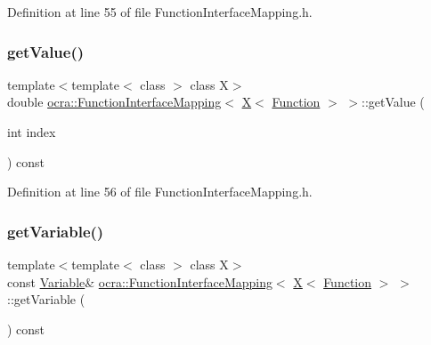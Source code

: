 Definition at line 55 of file Function\+Interface\+Mapping.\+h.

\hypertarget{structocra_1_1FunctionInterfaceMapping_3_01X_3_01Function_01_4_01_4_a97e745dc7e7a8a2af03e57d71aefa31c}{}\label{structocra_1_1FunctionInterfaceMapping_3_01X_3_01Function_01_4_01_4_a97e745dc7e7a8a2af03e57d71aefa31c} 
\subsubsection{\texorpdfstring{get\+Value()}{getValue()}\hspace{0.1cm}{\footnotesize\ttfamily [2/2]}}
{\footnotesize\ttfamily template$<$template$<$ class $>$ class X$>$ \\
double \hyperlink{structocra_1_1FunctionInterfaceMapping}{ocra\+::\+Function\+Interface\+Mapping}$<$ \hyperlink{namespaceocra_a436781c7059a0f76027df1c652126260a53f3cfeeb322946db40cd86dfebfb237}{X}$<$ \hyperlink{classocra_1_1Function}{Function} $>$ $>$\+::get\+Value (\begin{DoxyParamCaption}\item[{int}]{index }\end{DoxyParamCaption}) const\hspace{0.3cm}{\ttfamily [inline]}}



Definition at line 56 of file Function\+Interface\+Mapping.\+h.

\hypertarget{structocra_1_1FunctionInterfaceMapping_3_01X_3_01Function_01_4_01_4_a9058e43e7454b244cb55433205ecc163}{}\label{structocra_1_1FunctionInterfaceMapping_3_01X_3_01Function_01_4_01_4_a9058e43e7454b244cb55433205ecc163} 
\subsubsection{\texorpdfstring{get\+Variable()}{getVariable()}\hspace{0.1cm}{\footnotesize\ttfamily [1/2]}}
{\footnotesize\ttfamily template$<$template$<$ class $>$ class X$>$ \\
const \hyperlink{classocra_1_1Variable}{Variable}\& \hyperlink{structocra_1_1FunctionInterfaceMapping}{ocra\+::\+Function\+Interface\+Mapping}$<$ \hyperlink{namespaceocra_a436781c7059a0f76027df1c652126260a53f3cfeeb322946db40cd86dfebfb237}{X}$<$ \hyperlink{classocra_1_1Function}{Function} $>$ $>$\+::get\+Variable (\begin{DoxyParamCaption}{ }\end{DoxyParamCaption}) const\hspace{0.3cm}{\ttfamily [inline]}}



